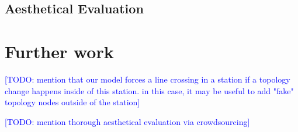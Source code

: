 \documentclass{llncs}
\newcommand\todo[1]{\textcolor{blue}{[TODO: #1]}}
\begin{document}
%
\subsection{Aesthetical Evaluation}
%

%
\section{Further work}
%

\todo{mention that our model forces a line crossing in a station if a topology change happens inside of this station. in this case, it may be useful to add "fake" topology nodes outside of the station}

\todo{mention thorough aesthetical evaluation via crowdsourcing}




\end{document}
